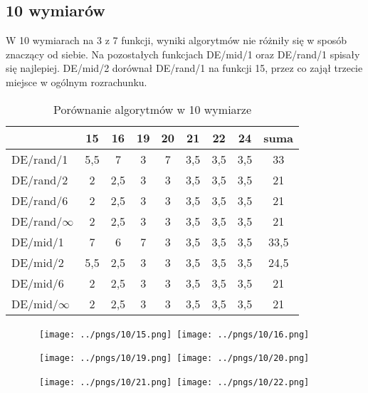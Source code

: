 \subsection{10 wymiarów}

W 10 wymiarach na 3 z 7 funkcji, wyniki algorytmów nie różniły się w sposób znaczący od siebie.
Na pozostałych funkcjach DE/mid/1 oraz DE/rand/1 spisały się najlepiej. DE/mid/2 dorównał DE/rand/1
na funkcji 15, przez co zajął trzecie miejsce w ogólnym rozrachunku. 

\begin{table}[H]
\centering
\begin{tabular}{ l | c | c | c | c | c | c | c | c}
                 & 15  & 16  & 19  & 20  & 21  & 22  & 24  & suma \\ \hline
DE/rand/1        & 5,5 & 7   & 3   & 7   & 3,5 & 3,5 & 3,5 & 33   \\ 
DE/rand/2        & 2   & 2,5 & 3   & 3   & 3,5 & 3,5 & 3,5 & 21   \\ 
DE/rand/6        & 2   & 2,5 & 3   & 3   & 3,5 & 3,5 & 3,5 & 21   \\ 
DE/rand/$\infty$ & 2   & 2,5 & 3   & 3   & 3,5 & 3,5 & 3,5 & 21   \\ 
DE/mid/1         & 7   & 6   & 7   & 3   & 3,5 & 3,5 & 3,5 & 33,5 \\
DE/mid/2         & 5,5 & 2,5 & 3   & 3   & 3,5 & 3,5 & 3,5 & 24,5 \\
DE/mid/6         & 2   & 2,5 & 3   & 3   & 3,5 & 3,5 & 3,5 & 21   \\ 
DE/mid/$\infty$  & 2   & 2,5 & 3   & 3   & 3,5 & 3,5 & 3,5 & 21   \\
\end{tabular}
\caption{Porównanie algorytmów w 10 wymiarze}
\label{table:10d}
\end{table}

\begin{figure}[H]
\centering
\mbox{
\texttt{[image: ../pngs/10/15.png]} \quad
\texttt{[image: ../pngs/10/16.png]} 
}
\end{figure}

\begin{figure}[H]
\centering
\mbox{
\texttt{[image: ../pngs/10/19.png]} \quad
\texttt{[image: ../pngs/10/20.png]} 
}
\end{figure}

\begin{figure}[H]
\centering
\mbox{
\texttt{[image: ../pngs/10/21.png]} \quad
\texttt{[image: ../pngs/10/22.png]} 
}
\end{figure}

